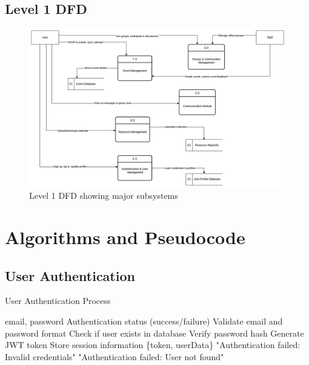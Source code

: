 \subsection{Level 1 DFD}
\begin{figure}[H]
    \centering
    \includegraphics[width=\textwidth]{latex-doc/images/dfd_level1.png}
    \caption{Level 1 DFD showing major subsystems}
    \label{fig:dfd1}
\end{figure}


\vspace{3cm}

\section{Algorithms and Pseudocode}
\label{sec:algorithms}

\subsection{User Authentication}
\begin{algorithm}[H]
\caption{User Authentication Process}\label{alg:auth}
\begin{algorithmic}[1]
\Require email, password
\Ensure Authentication status (success/failure)
\State Validate email and password format
\State Check if user exists in database
    \State Verify password hash
        \State Generate JWT token
        \State Store session information
        \State \Return \{token, userData\}
    \Else
        \State \Return "Authentication failed: Invalid credentials"
    \EndIf
\Else
    \State \Return "Authentication failed: User not found"
\EndIf
\end{algorithmic}
\end{algorithm}


